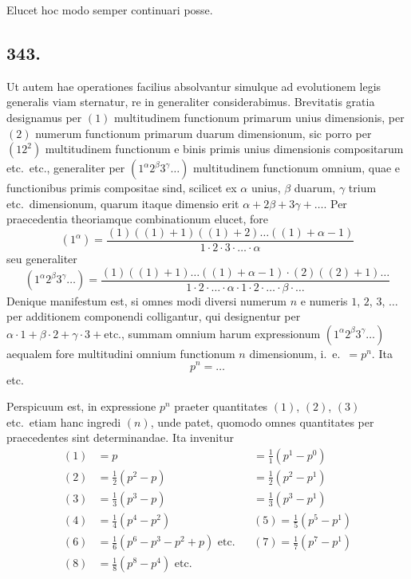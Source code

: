 \documentclass[12pt,a4paper]{article}
\begin{document}
Elucet hoc modo semper continuari posse.

\subsection*{343.}

Ut autem hae operationes facilius absolvantur simulque ad evolutionem legis generalis viam sternatur, re in generaliter considerabimus. Brevitatis gratia designamus per $(1)$ multitudinem functionum primarum unius dimensionis, per $(2)$ numerum functionum primarum duarum dimensionum, sic porro per $(12^2)$ multitudinem functionum e binis primis unius dimensionis compositarum etc.~etc., generaliter per $(1^\alpha 2^\beta 3^\gamma \ldots)$ multitudinem functionum omnium, quae e functionibus primis compositae sind, scilicet ex $\alpha$ unius, $\beta$ duarum, $\gamma$ trium etc.~dimensionum, quarum itaque dimensio erit $\alpha+2\beta+3\gamma+\ldots$. Per praecedentia theoriamque combinationum elucet, fore
\[
(1^\alpha) = \frac{(1)((1)+1)((1)+2)\ldots((1)+\alpha-1)}{1\cdot 2\cdot 3\cdot \ldots \cdot \alpha}
\]
seu generaliter
\[
(1^\alpha 2^\beta 3^\gamma \ldots) = \frac{(1)((1)+1)\ldots ((1)+\alpha-1)\cdot (2)((2)+1)\ldots}{1\cdot 2\cdot \ldots \cdot \alpha \cdot 1\cdot 2\cdot \ldots \cdot \beta \cdot \ldots}
\]
Denique manifestum est, si omnes modi diversi numerum $n$ e numeris $1$, $2$, $3$, $\ldots$ per additionem componendi colligantur, qui designentur per $\alpha\cdot 1 + \beta\cdot 2 + \gamma\cdot 3 + \text{etc.}$, summam omnium harum expressionum $(1^\alpha 2^\beta 3^\gamma \ldots)$ aequalem fore multitudini omnium functionum $n$ dimensionum, i.~e.~$=p^n$. Ita
\[
p^n = \ldots
\]
etc.

Perspicuum est, in expressione $p^n$ praeter quantitates $(1)$, $(2)$, $(3)$ etc.~etiam hanc ingredi $(n)$, unde patet, quomodo omnes quantitates per praecedentes sint determinandae. Ita invenitur
\[
\begin{aligned}
(1) &= p &&= \tfrac{1}{1}(p^1-p^0)\\
(2) &= \tfrac{1}{2}(p^2-p) &&= \tfrac{1}{2}(p^2-p^1)\\
(3) &= \tfrac{1}{3}(p^3-p) &&= \tfrac{1}{3}(p^3-p^1)\\
(4) &= \tfrac{1}{4}(p^4-p^2) && (5) = \tfrac{1}{5}(p^5-p^1)\\
(6) &= \tfrac{1}{6}(p^6-p^3-p^2+p) \text{ etc.} && (7) = \tfrac{1}{7}(p^7-p^1)\\
(8) &= \tfrac{1}{8}(p^8-p^4) \text{ etc.}
\end{aligned}
\]
\end{document}

